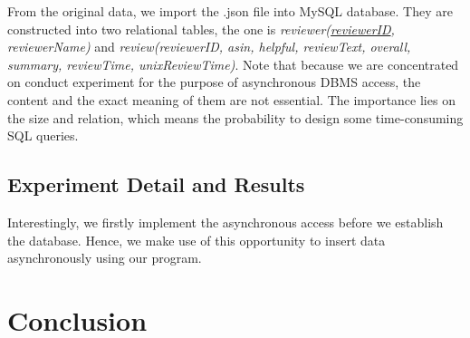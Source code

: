 \documentclass[onecolumn, conference, 12pt]{IEEEtran}
\begin{document}
	From the original data, we import the .json file into MySQL database. They are constructed into two relational tables, the one is \textit{reviewer(\underline{reviewerID}, reviewerName)} and \textit{review(reviewerID, asin, helpful, reviewText, overall, summary, reviewTime, unixReviewTime)}. Note that because we are concentrated on conduct experiment for the purpose of asynchronous DBMS access, the content and the exact meaning of them are not essential. The importance lies on the size and relation, which means the probability to design some time-consuming SQL queries.

	\subsection{Experiment Detail and Results}
	Interestingly, we firstly implement the asynchronous access before we establish the database. Hence, we make use of this opportunity to insert data asynchronously using our program. 
	\section{Conclusion}
	
	
	
	
	
\end{document}
